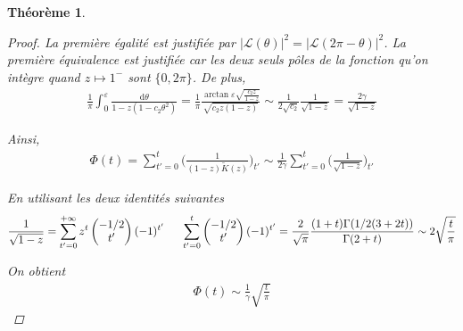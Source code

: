 \documentclass{article}
\newtheorem{theorem}{Théorème}[section]
\begin{document}
\begin{theorem}
\begin{proof}
La première égalité est justifiée par $|\mathcal{L}(\theta)|^2 = |\mathcal{L}(2\pi-\theta)|^2$. La première équivalence est justifiée car les deux seuls pôles de la fonction qu'on intègre quand $z\mapsto 1^{-}$ sont $\{0,2\pi\}$.
De plus,
\begin{align*}
	\frac{1}{\pi}\int_{0}^{\varepsilon}\frac{\mathrm{d}\theta}{1-z(1-c_2\theta^2)} = \frac{1}{\pi}\frac{\arctan\varepsilon\sqrt{\frac{c_2 z}{1-z}}}{\sqrt{c_2 z (1-z)}} \sim \frac{1}{2\sqrt{c_2}}\frac{1}{\sqrt{1-z}} = \frac{2\gamma}{\sqrt{1-z}}
\end{align*}

Ainsi, \begin{align*}
	\Phi(t) = \sum_{t'=0}^t \bigg(\frac{1}{(1-z)\tilde{K}(z)}\bigg)_{t'} \sim \frac{1}{2\gamma} \sum_{t'=0}^t \bigg(\frac{1}{\sqrt{1-z}}\bigg)_{t'}
\end{align*}

En utilisant les deux identités suivantes \begin{align*}
	\frac{1}{\sqrt{1-z}} = \sum_{t'=0}^{+\infty} z^t \begin{pmatrix}-1/2 \\ t'\end{pmatrix}(-1)^{t'} \indent \sum_{t'=0}^t \begin{pmatrix}-1/2\\t'\end{pmatrix} (-1)^{t'} = \frac{2}{\sqrt{\pi}} \frac{(1+t)\Gamma(1/2(3+2t))}{\Gamma(2+t)} \sim 2\sqrt{\frac{t}{\pi}}
\end{align*}

On obtient \begin{align*}
	\Phi(t) \sim \frac{1}{\gamma}\sqrt{\frac{t}{\pi}} 
\end{align*}



\end{proof}
\end{theorem}
\end{document}
